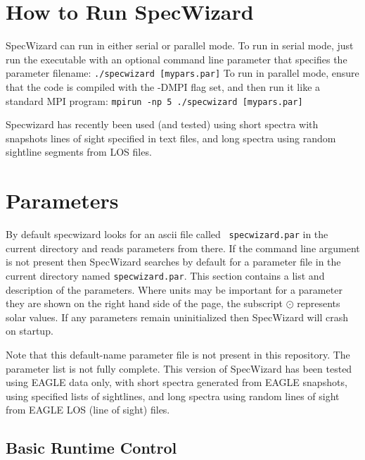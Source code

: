 \documentclass{report}
\begin{document}
\chapter{How to Run SpecWizard}

SpecWizard can run in either serial or parallel mode.  To run in serial mode, just run the executable with an optional command line parameter that specifies the parameter filename:
\linebreak\linebreak
{\tt ./specwizard [mypars.par]}
\linebreak\linebreak
To run in parallel mode, ensure that the code is compiled with the -DMPI flag set, and then run it like a standard MPI program:
\linebreak\linebreak
{\tt mpirun -np 5 ./specwizard [mypars.par]}
\linebreak\linebreak

Specwizard has recently been used (and tested) using short spectra with snapshots lines of sight specified in text files, and long spectra using random sightline segments from LOS files. 

\chapter{Parameters}

By default specwizard looks for an ascii file called {\tt
  specwizard.par} in the current directory and reads parameters from
there.  If the command line argument is not present then SpecWizard
searches by default for a parameter file in the current directory
named {\tt specwizard.par}.  This section contains a %
list and description of the parameters.  Where units may be important for a
parameter they are shown on the right hand side of the page, the
subscript ${\odot}$ represents solar values.  If any parameters remain
uninitialized then SpecWizard will crash on startup.  \linebreak

Note that this default-name parameter file is not present in this repository. The parameter list is not fully complete. This version of SpecWizard has been tested using EAGLE data only, with short spectra generated from EAGLE snapshots, using specified lists of sightlines, and long spectra using random lines of sight from EAGLE LOS (line of sight) files.
\section{Basic Runtime Control}
\end{document}
